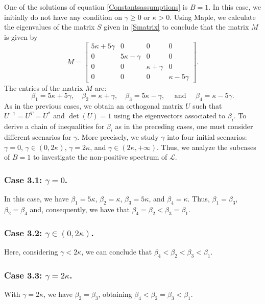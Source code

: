 \documentclass[10pt,reqno,a4paper]{amsart} %
\theoremstyle{definition} %
\numberwithin{equation}{section}
\numberwithin{figure}{section}
\begin{document}
One of the solutions of equation \eqref{Constantsassumptions} is $B=1$. In this case, we initially do not have any condition on $\gamma \geq 0$ or $\kappa > 0$. Using Maple, we calculate the eigenvalues of the matrix $S$ given in \eqref{Smatrix} to conclude that the matrix $M$ is given by
\begin{equation*}
M= \begin{bmatrix}
5\kappa+5\gamma & 0 & 0 & 0 \\ 
0 & 5\kappa-\gamma & 0 & 0 \\ 
0 & 0 & \kappa+\gamma & 0 \\ 
0 & 0 & 0 & \kappa-5\gamma
\end{bmatrix}.
\end{equation*}
The entries of the matrix $M$ are:
\begin{equation}
    \beta_1 = 5\kappa + 5\gamma, \quad \beta_2 = \kappa+\gamma, \quad \beta_3 = 5\kappa-\gamma, \quad \text{ and } \quad \beta_4 = \kappa - 5 \gamma.
\end{equation}
As in the previous cases, we obtain an orthogonal matrix $U$ such that $U^{-1}=U^T=U^*$ and $\det(U)=1$ using the eigenvectors associated to $\beta_i$. To derive a chain of inequalities for $\beta_i$ as in the preceding cases, one must consider different scenarios for $\gamma$. More precisely, we study $\gamma$ into four initial scenarios: $\gamma = 0$, $\gamma \in (0,2\kappa)$, $\gamma = 2\kappa$, and $\gamma \in (2\kappa, +\infty)$. Thus, we analyze the subcases of $B=1$ to investigate the non-positive spectrum of $\mathcal{L}$. 

\subsubsection*{Case 3.1: $\gamma = 0$.} 
In this case, we have $\beta_1 = 5\kappa$, $\beta_2 = \kappa$, $\beta_3 = 5\kappa$, and $\beta_4 = \kappa$. Thus, $\beta_1 = \beta_3$, $\beta_2 = \beta_4$ and, consequently, we have that $\beta_4 = \beta_2 < \beta_3 = \beta_1$.

\subsubsection*{Case 3.2: $\gamma \in (0,2\kappa)$.} 
Here, considering $\gamma < 2 \kappa$, we can conclude that $\beta_4 < \beta_2 < \beta_3 < \beta_1$.

\subsubsection*{Case 3.3: $\gamma = 2\kappa$.} 
With $\gamma = 2\kappa$, we have $\beta_2 = \beta_3$, obtaining $\beta_4 < \beta_2 = \beta_3 < \beta_1$.
\end{document}
